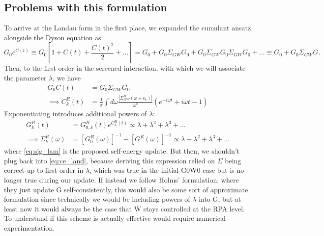 \subsection{Problems with this formulation}
To arrive at the Landau form in the first place, we expanded the cumulant ansatz alongside the Dyson equation as 
\begin{equation}
    G_0 e^{C(t)} \equiv G_0 [ 1 + C(t) + \frac{C(t)^2}{2} + \ldots ] = G_0 + G_0 \Sigma_{GW} G_0 + G_0 \Sigma_{GW} G_0 \Sigma_{GW} G_0 + \ldots \equiv G_0 + G_0 \Sigma_{GW} G.
\end{equation}
Then, to the first order in the screened interaction, with which we will associate the parameter $\lambda$, we have 
\begin{align}
    G_0 C(t) &= G_0 \Sigma_{GW} G_0 \label{eq:gw_match} \\
\implies  C_{k}^R(t) &= \frac{1}{\pi}\int d\omega \frac{|\Sigma_{GW}^R(\omega+\epsilon_k)|}{\omega^2} \left( e^{-i\omega t} + i\omega t - 1 \right) \label{eq:ce_land}
\end{align}
Exponentiating introduces additional powers of $\lambda$:
\begin{align}
  G^{R}_{k}(t) &= G_{0,k}^R(t) e^{C_{k}^{R}(t)} \propto \lambda + \lambda^2 + \lambda^3 + \ldots\\
\implies  \Sigma^R_k(\omega ) &= \left[G_0^R(\omega )\right]^{-1} - \left[G^R(\omega )\right]^{-1} \propto \lambda + \lambda^{2} + \lambda^{3} + \ldots
\label{eq:sig_lam}
\end{align}
where \eqref{eq:sig_lam} is the proposed self-energy update. But then, we shouldn't plug back into \eqref{eq:ce_land}, because deriving this expression relied on $\Sigma$ being correct up to first order in $\lambda$, which was true in the initial G0W0 case but is no longer true during our update. If instead we follow Holms' formulation, where they just update G self-consistently, this would also be some sort of approximate formulation since technically we would be including powers of $\lambda$ into G, but at least now it would always be the case that W stays controlled at the RPA level. To understand if this scheme is actually effective would require numerical experimentation. 

